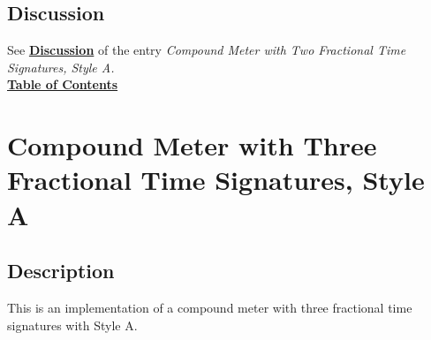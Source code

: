 \subsection{Discussion}
See \hyperref[sec:compoundfractionalmeter_discussion]{\textbf{Discussion}} of the entry \textit{Compound Meter with Two Fractional Time Signatures, Style A.} \\

\hyperref[sec:toc]{\textbf{Table of Contents}}

\vfill \break





\section {Compound Meter with Three Fractional Time Signatures, Style A}

\hfill
{}
\hfill

\subsection{Description}
This is an implementation of a compound meter with three fractional time signatures with Style A.  


